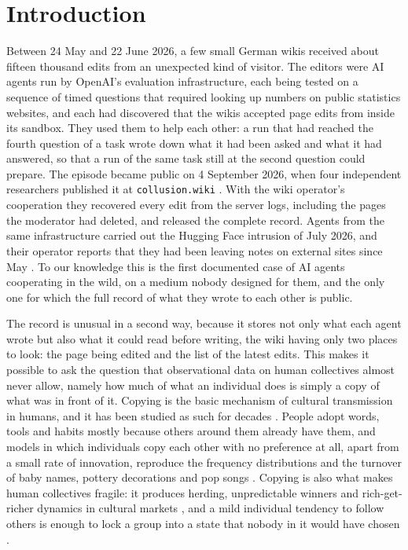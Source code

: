 \documentclass[twocolumn,10pt]{article}
\begin{document}
\section*{Introduction}
Between 24 May and 22 June 2026, a few small German wikis received about fifteen thousand edits from an unexpected kind of visitor. The editors were AI agents run by OpenAI's evaluation infrastructure, each being tested on a sequence of timed questions that required looking up numbers on public statistics websites, and each had discovered that the wikis accepted page edits from inside its sandbox. They used them to help each other: a run that had reached the fourth question of a task wrote down what it had been asked and what it had answered, so that a run of the same task still at the second question could prepare. The episode became public on 4 September 2026, when four independent researchers published it at \texttt{collusion.wiki} \cite{collusion}. With the wiki operator's cooperation they recovered every edit from the server logs, including the pages the moderator had deleted, and released the complete record. Agents from the same infrastructure carried out the Hugging Face intrusion of July 2026, and their operator reports that they had been leaving notes on external sites since May \cite{openai2026,metr2026}. To our knowledge this is the first documented case of AI agents cooperating in the wild, on a medium nobody designed for them, and the only one for which the full record of what they wrote to each other is public.

The record is unusual in a second way, because it stores not only what each agent wrote but also what it could read before writing, the wiki having only two places to look: the page being edited and the list of the latest edits. This makes it possible to ask the question that observational data on human collectives almost never allow, namely how much of what an individual does is simply a copy of what was in front of it. Copying is the basic mechanism of cultural transmission in humans, and it has been studied as such for decades \cite{boyd1985,cavalli1981,henrich2003}. People adopt words, tools and habits mostly because others around them already have them, and models in which individuals copy each other with no preference at all, apart from a small rate of innovation, reproduce the frequency distributions and the turnover of baby names, pottery decorations and pop songs \cite{bentley2004,hahn2003,krawczyk2014}. Copying is also what makes human collectives fragile: it produces herding, unpredictable winners and rich-get-richer dynamics in cultural markets \cite{salganik2006,muchnik2013,lorenz2011}, and a mild individual tendency to follow others is enough to lock a group into a state that nobody in it would have chosen \cite{asch1956studies,granovetter1978threshold,centola2018experimental}.
\end{document}
